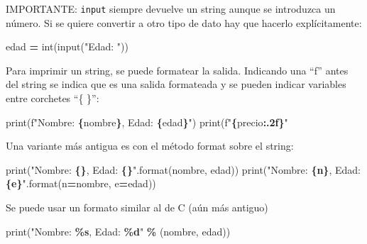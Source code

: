 \documentclass[
]{book}
\newenvironment{Shaded}{\begin{snugshade}}{\end{snugshade}}
\newcommand{\BuiltInTok}[1]{#1}
\newcommand{\NormalTok}[1]{#1}
\newcommand{\OperatorTok}[1]{\textcolor[rgb]{0.81,0.36,0.00}{\textbf{#1}}}
\newcommand{\SpecialCharTok}[1]{\textcolor[rgb]{0.81,0.36,0.00}{\textbf{#1}}}
\newcommand{\SpecialStringTok}[1]{\textcolor[rgb]{0.31,0.60,0.02}{#1}}
\newcommand{\StringTok}[1]{\textcolor[rgb]{0.31,0.60,0.02}{#1}}
\theoremstyle{break}
\theoremstyle{nonumberplain}
\begin{document}
IMPORTANTE: \texttt{input} siempre devuelve un string aunque se introduzca un número.
Si se quiere convertir a otro tipo de dato hay que hacerlo explícitamente:

\begin{Shaded}
\begin{Highlighting}[]
\NormalTok{edad }\OperatorTok{=} \BuiltInTok{int}\NormalTok{(}\BuiltInTok{input}\NormalTok{(}\StringTok{"Edad: "}\NormalTok{))}
\end{Highlighting}
\end{Shaded}

Para imprimir un string, se puede formatear la salida.
Indicando una ``f'' antes del string se indica que es una salida formateada
y se pueden indicar variables entre corchetes ``\{ \}'':

\begin{Shaded}
\begin{Highlighting}[]
\BuiltInTok{print}\NormalTok{(}\SpecialStringTok{f"Nombre: }\SpecialCharTok{\{}\NormalTok{nombre}\SpecialCharTok{\}}\SpecialStringTok{, Edad: }\SpecialCharTok{\{}\NormalTok{edad}\SpecialCharTok{\}}\SpecialStringTok{"}\NormalTok{)}
\BuiltInTok{print}\NormalTok{(}\SpecialStringTok{f"}\SpecialCharTok{\{}\NormalTok{precio}\SpecialCharTok{:.2f\}}\SpecialStringTok{"}
\end{Highlighting}
\end{Shaded}

Una variante más antigua es con el método format sobre el string:

\begin{Shaded}
\begin{Highlighting}[]
\BuiltInTok{print}\NormalTok{(}\StringTok{"Nombre: }\SpecialCharTok{\{\}}\StringTok{, Edad: }\SpecialCharTok{\{\}}\StringTok{"}\NormalTok{.}\BuiltInTok{format}\NormalTok{(nombre, edad))}
\BuiltInTok{print}\NormalTok{(}\StringTok{"Nombre: }\SpecialCharTok{\{n\}}\StringTok{, Edad: }\SpecialCharTok{\{e\}}\StringTok{"}\NormalTok{.}\BuiltInTok{format}\NormalTok{(n}\OperatorTok{=}\NormalTok{nombre, e}\OperatorTok{=}\NormalTok{edad))}
\end{Highlighting}
\end{Shaded}

Se puede usar un formato similar al de C (aún más antiguo)

\begin{Shaded}
\begin{Highlighting}[]
\BuiltInTok{print}\NormalTok{(}\StringTok{"Nombre: }\SpecialCharTok{\%s}\StringTok{, Edad: }\SpecialCharTok{\%d}\StringTok{"} \OperatorTok{\%}\NormalTok{ (nombre, edad))}
\end{Highlighting}
\end{Shaded}
\end{document}

